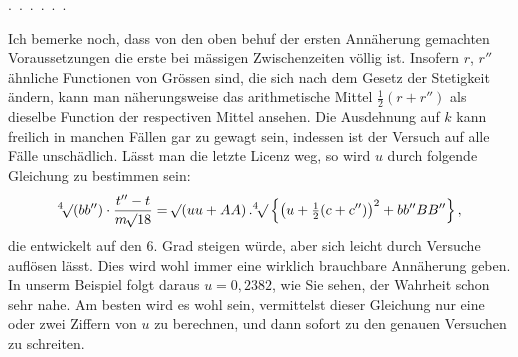 \noindent\hspace*{\parindent}.\ .\ .\ .\ .\ .\par
Ich bemerke noch, dass von den oben behuf der ersten Annäherung gemachten Voraussetzungen die erste bei mässigen Zwischenzeiten völlig  ist. Insofern \(r\), \(r''\) ähnliche Functionen von Grössen sind, die sich nach dem Gesetz der Stetigkeit ändern, kann man näherungsweise das arithmetische Mittel \(\tfrac12(r+r'')\) als dieselbe Function der respectiven Mittel ansehen. Die Ausdehnung auf \(k\) kann freilich in manchen Fällen gar zu gewagt sein, indessen ist der Versuch auf alle Fälle unschädlich. Lässt man die letzte Licenz weg, so wird \(u\) durch folgende Gleichung zu bestimmen sein:
\[
\BareRoot[4]{(bb'')}\cdot\frac{t''-t}{m\BareRoot{18}}=\BareRoot{(uu+AA)}\,.\BareRoot[4]{\left\{\bigl(u+\tfrac12(c+c'')\bigr)^2+bb''BB''\right\}},
\]
die entwickelt auf den 6. Grad steigen würde, aber sich leicht durch Versuche auflösen lässt. Dies wird wohl immer eine wirklich brauchbare Annäherung geben. In unserm Beispiel folgt daraus \(u=0{,}2382\), wie Sie sehen, der Wahrheit schon sehr nahe. Am besten wird es wohl sein, vermittelst dieser Gleichung nur eine oder zwei Ziffern von \(u\) zu berechnen, und dann sofort zu den genauen Versuchen zu schreiten.
\par\medskip\noindent\makebox[\linewidth]{\rule{.18\linewidth}{.35pt}}\par
